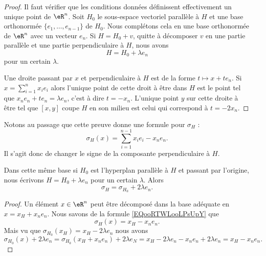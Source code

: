\begin{proof}
    Il faut vérifier que les conditions données définissent effectivement un unique point de \( \eR^n\). Soit \( H_0\) le sous-espace vectoriel parallèle à \( H\) et une base orthonormée \( \{ e_1,\ldots, e_{n-1} \}\) de \( H_0\). Nous complétons cela en une base orthonormée de \( \eR^n\) avec un vecteur \( e_n\). Si \( H=H_0+v\), quitte à décomposer \( v\) en une partie parallèle et une partie perpendiculaire à \( H\), nous avons
    \begin{equation}
        H=H_0+\lambda e_n
    \end{equation}
    pour un certain \( \lambda\).

    Une droite passant par \( x\) et perpendiculaire à \( H\) est de la forme \( t\mapsto x+te_n\). Si \( x=\sum_{i=1}^{n}x_ie_i\) alors l'unique point de cette droit à être dans \( H\) est le point tel que \(   x_ne_n+te_n=\lambda e_n   \), c'est à dire \( t=-x_n\). L'unique point \( y\) sur cette droite à être tel que \( [x,y ]\) coupe \( H\) en son milieu est celui qui correspond à \( t=-2x_n\). 
\end{proof}

Notons au passage que cette preuve donne une formule pour \( \sigma_H\) :
\begin{equation}        \label{EQooRTWLooLPsUpY}
    \sigma_H(x)=\sum_{i=1}^{n-1}x_ie_i-x_ne_n.
\end{equation}
Il s'agit donc de changer le signe de la composante perpendiculaire à \( H\).

\begin{lemma}       \label{LEMooWYVRooQmWqvM}
    Dans cette même base si \( H_0\) est l'hyperplan parallèle à \( H\) et passant par l'origine, nous écrivons \( H=H_0+\lambda e_n\) pour un certain \( \lambda\). Alors
    \begin{equation}
        \sigma_H=\sigma_{H_0}+2\lambda e_n.
    \end{equation}
\end{lemma}

\begin{proof}
    Un élément \( x\in \eR^n\) peut être décomposé dans la base adéquate en \( x=x_H+x_ne_n\). Nous savons de la formule \eqref{EQooRTWLooLPsUpY} que 
    \begin{equation}
        \sigma_H(x)=x_H-x_ne_n.
    \end{equation}
    Mais vu que \( \sigma_{H_0}(x_H)=x_H-2\lambda e_n\) nous avons
    \begin{equation}
            \sigma_{H_0}(x)+2\lambda e_n=\sigma_{H_0}(x_H+x_ne_n)+2\lambda e_N=x_H-2\lambda e_n-x_ne_n+2\lambda e_n=x_H-x_ne_n.
    \end{equation}
\end{proof}

